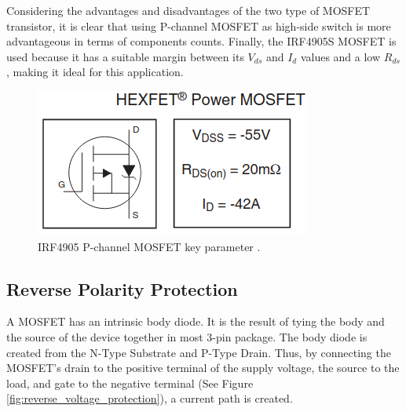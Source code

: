 \documentclass[../main.tex]{subfiles}
\begin{document}
    \justify
    Considering the advantages and disadvantages of the two type of MOSFET transistor, it is clear that using P-channel MOSFET as high-side switch is more advantageous in terms of components counts. Finally, the IRF4905S MOSFET is used because it has a suitable margin between its $V_{ds}$ and $I_{d}$ values and a low $R_{ds}$, making it ideal for this application. 

    \begin{figure}[!h]
        \centerline{\includegraphics[scale=0.5]{media/IRF4905_key_parameters.png}}
        \caption{IRF4905 P-channel MOSFET key parameter \cite{IRF4905S}.}
        \label{fig:IRF4905S_param}
    \end{figure}   
    
    \pagebreak
    \subsection{Reverse Polarity Protection} \label{ssec:reverse_voltage_protection}
    \justify
    A MOSFET has an intrinsic body diode. It is the result of tying the body and the source of the device together in most 3-pin package. The body diode is created from the N-Type Substrate and P-Type Drain. Thus, by connecting the MOSFET's drain to the positive terminal of the supply voltage, the source to the load, and gate to the negative terminal (See Figure \ref{fig:reverse_voltage_protection}), a current path is created. 
    
\end{document}
